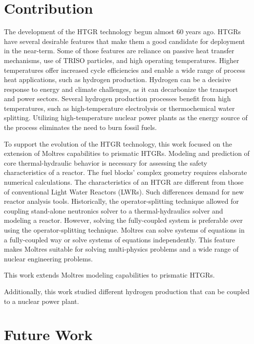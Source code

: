 \section{Contribution}

The development of the HTGR technology begun almost 60 years ago.
HTGRs have several desirable features that make them a good candidate for deployment in the near-term.
Some of those features are reliance on passive heat transfer mechanisms, use of TRISO particles, and high operating temperatures.
Higher temperatures offer increased cycle efficiencies and enable a wide range of process heat applications, such as hydrogen production.
Hydrogen can be a decisive response to energy and climate challenges, as it can decarbonize the transport and power sectors.
Several hydrogen production processes benefit from high temperatures, such as high-temperature electrolysis or thermochemical water splitting.
Utilizing high-temperature nuclear power plants as the energy source of the process eliminates the need to burn fossil fuels.

To support the evolution of the HTGR technology, this work focused on the extension of Moltres capabilities to prismatic HTGRs.
Modeling and prediction of core thermal-hydraulic behavior is necessary for assessing the safety characteristics of a reactor.
The fuel blocks’ complex geometry requires elaborate numerical calculations.
The characteristics of an HTGR are different from those of conventional Light Water Reactors (LWRs).
Such differences demand for new reactor analysis tools.
Historically, the operator-splitting technique allowed for coupling stand-alone neutronics solver to a thermal-hydraulics solver and modeling a reactor.
However, solving the fully-coupled system is preferable over using the operator-splitting technique.
Moltres can solve systems of equations in a fully-coupled way or solve systems of equations independently. This feature makes Moltres suitable for solving multi-physics problems and a wide range of nuclear engineering problems.

This work extends Moltres modeling capabilities to prismatic HTGRs.


Additionally, this work studied different hydrogen production that can be coupled to a nuclear power plant.


\section{Future Work}

